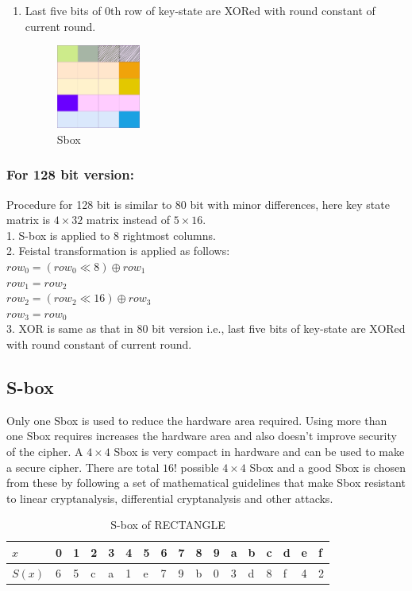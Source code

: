 \documentclass[final]{transcrypto}
\begin{document}
\begin{enumerate}
\begin{figure}[H]
\end{figure}
    \item Last five bits of 0th row  of key-state are XORed with round constant of current round.\\
\begin{figure}[H]
\caption{Sbox}
\centering
\includegraphics[width=0.26\textwidth]{images/key_s_rc.png}
\end{figure}
\end{enumerate}


\subsubsection{For 128 bit version:}
Procedure for 128 bit is similar to 80 bit with minor differences, here key state matrix is $4\times 32$ matrix instead of $5\times 16$.\\
1. S-box is applied to 8 rightmost columns.\\
2. Feistal transformation is applied as follows:\\
\hspace*{0.7cm}$row_0 = (row_0\ll 8)\oplus row_1$\\
\hspace*{0.7cm}$row_1 = row_2$\\
\hspace*{0.7cm}$row_2 = (row_2\ll 16)\oplus row_3$\\
\hspace*{0.7cm}$row_3 = row_0$\\
3. XOR is same as that in 80 bit version i.e., last five bits of key-state are XORed with round constant of current round.
\subsection{S-box}
\label{sbx}
Only one Sbox is used to reduce the hardware area required. Using more than one Sbox requires increases the hardware area and also doesn't improve security of the cipher. A $4\times 4$ Sbox is very compact in hardware and can be used to make a secure cipher. There are total $16!$ possible $4\times 4$ Sbox and a good Sbox is chosen from these by following a set of mathematical guidelines that make Sbox resistant to linear cryptanalysis, differential cryptanalysis and other attacks.
\begin{table}[H]
	\centering
	\caption{S-box of RECTANGLE}
	\begin{tabular}{|l|l|l|l|l|l|l|l|l|l|l|l|l|l|l|l|l|}
		\hline
 $x$&0&1&2&3&4&5&6&7&8&9&a&b&c&d&e&f\\ \hline
$S(x)$&6&5&c&a&1&e&7&9&b&0&3&d&8&f&4&2 \\ \hline

	\end{tabular}
\end{table}
\end{document}
